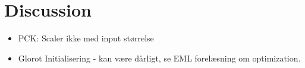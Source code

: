 \documentclass[./main.tex]{subfiles}
\begin{document}
\section{Discussion}
\begin{itemize}
    \item PCK: Scaler ikke med input størrelse
    \item Glorot Initialisering - kan være dårligt, se EML forelæsning om optimization.
\end{itemize}
\end{document}
